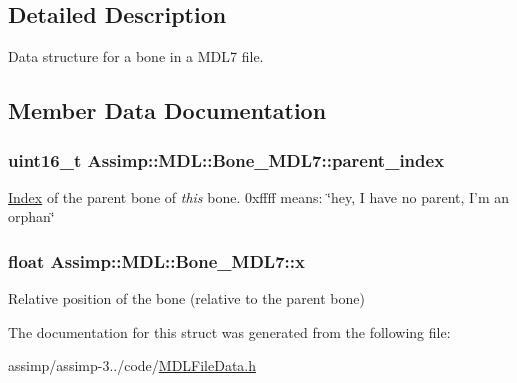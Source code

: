 \subsection{Detailed Description}
Data structure for a bone in a M\+D\+L7 file. 

\subsection{Member Data Documentation}
\hypertarget{struct_assimp_1_1_m_d_l_1_1_bone___m_d_l7_a60d6ad925de5dbf371061fdd3576c776}{
\subsubsection[{parent\+\_\+index}]{\setlength{\rightskip}{0pt plus 5cm}uint16\+\_\+t Assimp\+::\+M\+D\+L\+::\+Bone\+\_\+\+M\+D\+L7\+::parent\+\_\+index}}\label{struct_assimp_1_1_m_d_l_1_1_bone___m_d_l7_a60d6ad925de5dbf371061fdd3576c776}
\hyperlink{struct_index}{Index} of the parent bone of {\itshape this} bone. 0xffff means\+: \char`\"{}hey, I have no parent, I'm an orphan\char`\"{} \hypertarget{struct_assimp_1_1_m_d_l_1_1_bone___m_d_l7_a06338a1d122c6c1f5f2e256d127e3124}{
\subsubsection[{x}]{\setlength{\rightskip}{0pt plus 5cm}float Assimp\+::\+M\+D\+L\+::\+Bone\+\_\+\+M\+D\+L7\+::x}}\label{struct_assimp_1_1_m_d_l_1_1_bone___m_d_l7_a06338a1d122c6c1f5f2e256d127e3124}
Relative position of the bone (relative to the parent bone) 

The documentation for this struct was generated from the following file\+:\begin{DoxyCompactItemize}
\item 
assimp/assimp-\/3../code/\hyperlink{_m_d_l_file_data_8h}{M\+D\+L\+File\+Data.\+h}\end{DoxyCompactItemize}
